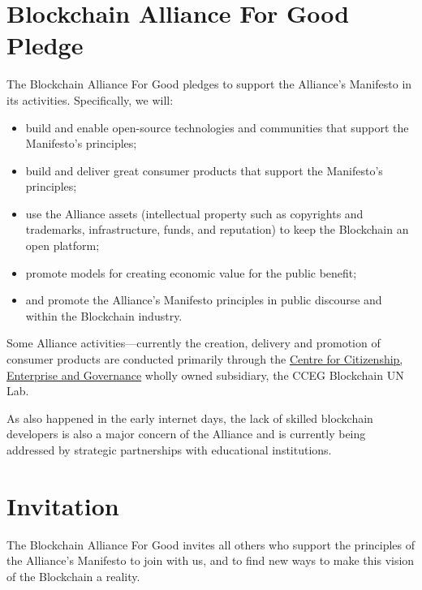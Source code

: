 \documentclass[twoside,twocolumn]{article}
\begin{document}
\section{Blockchain Alliance For Good Pledge}
The Blockchain Alliance For Good pledges to support the Alliance's Manifesto in
its activities. Specifically, we will:

\begin{itemize}
  \item build and enable open-source technologies and communities that support
  the Manifesto’s principles;
  \item build and deliver great consumer products that support the Manifesto’s
  principles;
  \item use the Alliance assets (intellectual property such as copyrights and
  trademarks, infrastructure, funds, and reputation) to keep the Blockchain an
  open platform;
  \item promote models for creating economic value for the public benefit;
  \item and promote the Alliance's Manifesto principles in public discourse and
  within the Blockchain industry.
\end{itemize}

Some Alliance activities—currently the creation, delivery and promotion of
consumer products are conducted primarily through the
\href{www.cceg.org.uk}{Centre for Citizenship, Enterprise and Governance} wholly
owned subsidiary, the CCEG Blockchain UN Lab.

As also happened in the early internet days, the lack of skilled
blockchain developers is also a major concern of the Alliance and is currently
being addressed by strategic partnerships with educational institutions.

\section{Invitation}

The Blockchain Alliance For Good invites all others who support the principles of the
Alliance's Manifesto to join with us, and to find new ways to make this vision
of the Blockchain a reality.

\end{document}
